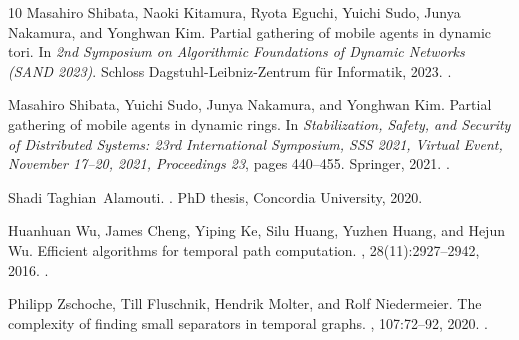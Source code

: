 \documentclass[10pt,a4paper]{article}
\begin{document}
\begin{thebibliography}{10}
Masahiro Shibata, Naoki Kitamura, Ryota Eguchi, Yuichi Sudo, Junya Nakamura,
  and Yonghwan Kim.
\newblock Partial gathering of mobile agents in dynamic tori.
\newblock In {\em 2nd Symposium on Algorithmic Foundations of Dynamic Networks
  (SAND 2023)}. Schloss Dagstuhl-Leibniz-Zentrum f{\"u}r Informatik, 2023.
\newblock \href {https://doi.org/10.4230/LIPIcs.SAND.2023.2}
  {}.

Masahiro Shibata, Yuichi Sudo, Junya Nakamura, and Yonghwan Kim.
\newblock Partial gathering of mobile agents in dynamic rings.
\newblock In {\em Stabilization, Safety, and Security of Distributed Systems:
  23rd International Symposium, SSS 2021, Virtual Event, November 17--20, 2021,
  Proceedings 23}, pages 440--455. Springer, 2021.
\newblock \href {https://doi.org/10.1007/978-3-030-91081-5_29}
  {}.

Shadi Taghian~Alamouti.
.
\newblock PhD thesis, Concordia University, 2020.

Huanhuan Wu, James Cheng, Yiping Ke, Silu Huang, Yuzhen Huang, and Hejun Wu.
\newblock Efficient algorithms for temporal path computation.
,
  28(11):2927--2942, 2016.
\newblock \href {https://doi.org/10.1109/TKDE.2016.2594065}
  {}.

Philipp Zschoche, Till Fluschnik, Hendrik Molter, and Rolf Niedermeier.
\newblock The complexity of finding small separators in temporal graphs.
, 107:72--92, 2020.
\newblock \href {https://doi.org/10.1016/j.jcss.2019.07.006}
  {}.

\end{thebibliography}
\end{document}
